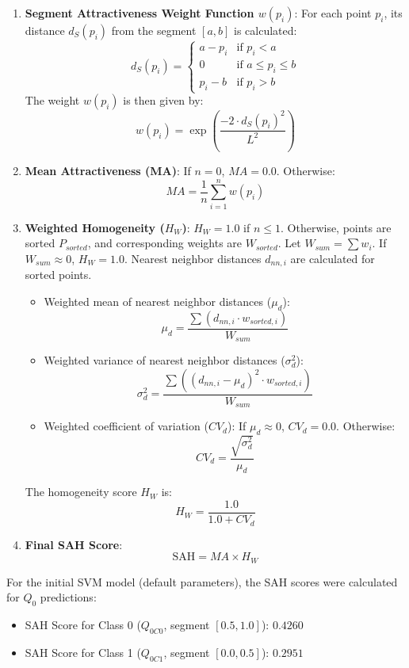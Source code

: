\documentclass{article}
\begin{document}
\begin{enumerate}
    \item \textbf{Segment Attractiveness Weight Function $w(p_i)$}:
    For each point $p_i$, its distance $d_S(p_i)$ from the segment $[a,b]$ is calculated:
    $$ d_S(p_i) = \begin{cases} a - p_i & \text{if } p_i < a \\ 0 & \text{if } a \le p_i \le b \\ p_i - b & \text{if } p_i > b \end{cases} $$
    The weight $w(p_i)$ is then given by:
    $$ w(p_i) = \exp\left(\frac{-2 \cdot d_S(p_i)^2}{L^2}\right) $$

    \item \textbf{Mean Attractiveness (MA)}:
    If $n=0$, $MA=0.0$. Otherwise:
    $$ MA = \frac{1}{n} \sum_{i=1}^{n} w(p_i) $$

    \item \textbf{Weighted Homogeneity ($H_W$)}:
    $H_W = 1.0$ if $n \le 1$. Otherwise, points are sorted $P_{sorted}$, and corresponding weights are $W_{sorted}$.
    Let $W_{sum} = \sum w_i$. If $W_{sum} \approx 0$, $H_W = 1.0$.
    Nearest neighbor distances $d_{nn,i}$ are calculated for sorted points.
    \begin{itemize}
        \item Weighted mean of nearest neighbor distances ($\mu_d$):
        $$ \mu_d = \frac{\sum (d_{nn,i} \cdot w_{sorted,i})}{W_{sum}} $$
        \item Weighted variance of nearest neighbor distances ($\sigma_d^2$):
        $$ \sigma_d^2 = \frac{\sum ((d_{nn,i} - \mu_d)^2 \cdot w_{sorted,i})}{W_{sum}} $$
        \item Weighted coefficient of variation ($CV_d$):
        If $\mu_d \approx 0$, $CV_d = 0.0$. Otherwise:
        $$ CV_d = \frac{\sqrt{\sigma_d^2}}{\mu_d} $$
    \end{itemize}
    The homogeneity score $H_W$ is:
    $$ H_W = \frac{1.0}{1.0 + CV_d} $$

    \item \textbf{Final SAH Score}:
    $$ \text{SAH} = MA \times H_W $$
\end{enumerate}

For the initial SVM model (default parameters), the SAH scores were calculated for $Q_0$ predictions:
\begin{itemize}
    \item SAH Score for Class 0 ($Q_{0C0}$, segment $[0.5, 1.0]$): $0.4260$ 
    \item SAH Score for Class 1 ($Q_{0C1}$, segment $[0.0, 0.5]$): $0.2951$ 
\end{itemize}
\end{document}
